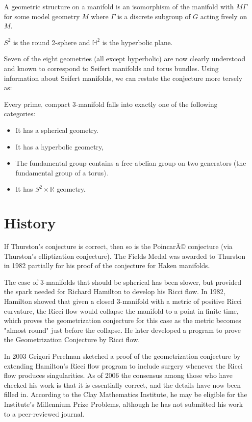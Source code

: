 \documentclass[12pt]{article}
\begin{document}
A geometric structure on a manifold is an isomorphism of the manifold with $M\Gamma$ for some model geometry $M$ where $\Gamma$ is a discrete subgroup of $G$ acting freely on $M$.

$S^2$ is the round 2-sphere and  $\mathbb{H}^2$ is the hyperbolic plane. 

Seven of the eight geometries (all except hyperbolic) are now clearly understood and known to correspond to Seifert manifolds and torus bundles.  Using information about Seifert manifolds, we can restate the conjecture more tersely as:

Every prime, compact 3-manifold falls into exactly one of the following categories:

\begin{itemize}

\item It has a spherical geometry.

\item It has a hyperbolic geometry,

\item The fundamental group contains a free abelian group on two generators (the fundamental group of a torus).

\item It has $S^2 \times \mathbb{R}$ geometry.

\end{itemize}

\section{History}

If Thurston's conjecture is correct, then so is the PoincarÃ© conjecture (via Thurston's elliptization conjecture). The Fields Medal was awarded to Thurston in 1982 partially for his proof of the conjecture for Haken manifolds.

The case of 3-manifolds that should be spherical has been slower, but provided the spark needed for Richard Hamilton to develop his Ricci flow.  In 1982, Hamilton showed that given a closed 3-manifold with a metric of positive Ricci curvature, the Ricci flow would collapse the manifold to a point in finite time, which proves the geometrization conjecture for this case as the metric becomes "almost round" just before the collapse.  He later developed a program to prove the Geometrization Conjecture by Ricci flow.

In 2003 Grigori Perelman sketched a proof of the geometrization conjecture by extending Hamilton's Ricci flow program to include surgery whenever the Ricci flow produces singularities. As of 2006 the consensus among those who have checked his work is that it is essentially correct, and the details have now been filled in. According to the Clay Mathematics Institute, he may be eligible for the Institute's Millennium Prize Problems, although he has not submitted his work to a peer-reviewed journal.
\end{document}
